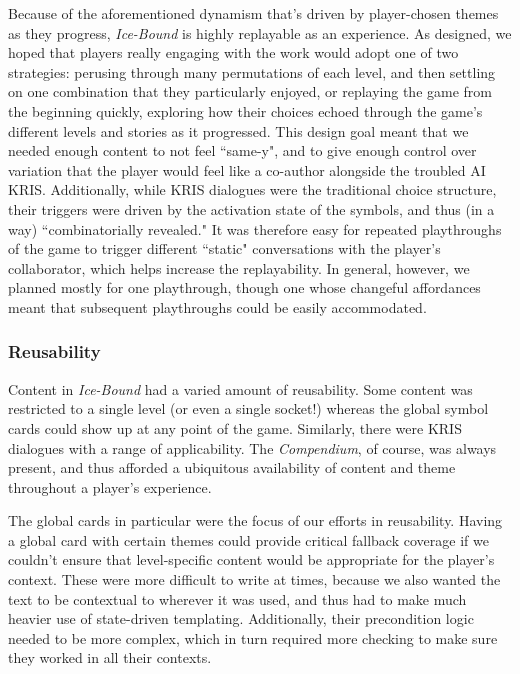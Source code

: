 Because of the aforementioned dynamism that's driven by player-chosen themes as they progress, \textit{Ice-Bound} is highly replayable as an experience. As designed, we hoped that players really engaging with the work would adopt one of two strategies: perusing through many permutations of each level, and then settling on one combination that they particularly enjoyed, or replaying the game from the beginning quickly, exploring how their choices echoed through the game's different levels and stories as it progressed. This design goal meant that we needed enough content to not feel ``same-y", and to give enough control over variation that the player would feel like a co-author alongside the troubled AI KRIS. Additionally, while KRIS dialogues were the traditional choice structure, their triggers were driven by the activation state of the symbols, and thus (in a way) ``combinatorially revealed." It was therefore easy for repeated playthroughs of the game to trigger different ``static" conversations with the player's collaborator, which helps increase the replayability. In general, however, we planned mostly for one playthrough, though one whose changeful affordances meant that subsequent playthroughs could be easily accommodated.

\subsubsection{Reusability}\label{subsubsec:icebound-reusability}

Content in \textit{Ice-Bound} had a varied amount of reusability. Some content was restricted to a single level (or even a single socket!) whereas the global symbol cards could show up at any point of the game. Similarly, there were KRIS dialogues with a range of applicability. The \textit{Compendium}, of course, was always present, and thus afforded a ubiquitous availability of content and theme throughout a player's experience.

The global cards in particular were the focus of our efforts in reusability. Having a global card with certain themes could provide critical fallback coverage if we couldn't ensure that level-specific content would be appropriate for the player's context. These were more difficult to write at times, because we also wanted the text to be contextual to wherever it was used, and thus had to make much heavier use of state-driven templating. Additionally, their precondition logic needed to be more complex, which in turn required more checking to make sure they worked in all their contexts.

